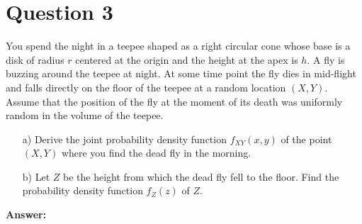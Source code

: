 \documentclass[hidelinks]{article}
\begin{document}
\section{Question 3}
You spend the night in a teepee shaped as a right circular cone whose base is a disk of
radius $r$ centered at the origin and the height at the apex is $h$. A fly is buzzing around
the teepee at night. At some time point the fly dies in mid-flight and falls directly on
the floor of the teepee at a random location $(X, Y )$. Assume that the position of the
fly at the moment of its death was uniformly random in the volume of the teepee.
\begin{enumerate}
    \item[a)] Derive the joint probability density function $f_{XY}(x, y)$ of the point $(X, Y )$ where you find the dead fly in the morning.
    \item[b)] Let $Z$ be the height from which the dead fly fell to the floor. Find the
    probability density function $f_Z(z)$ of $Z$.
\end{enumerate}
\textbf{Answer:}
\end{document}
